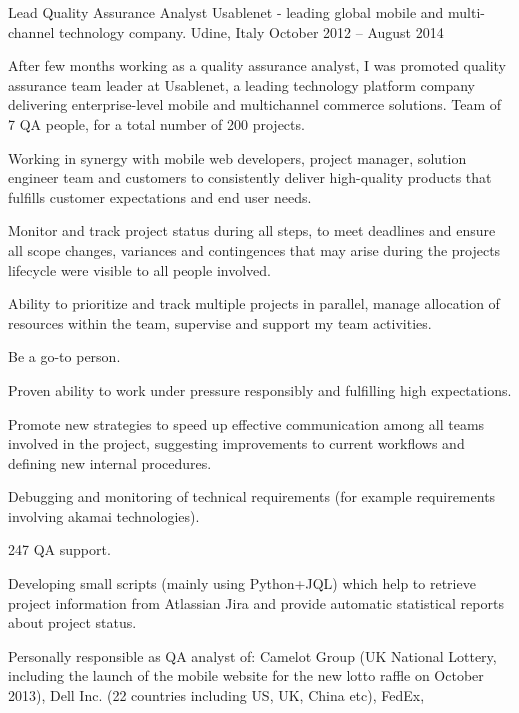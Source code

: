 \begin{cventries}
\cventry
{Lead Quality Assurance Analyst} 
{Usablenet - leading global mobile and multi-channel technology company.}
   {Udine, Italy}
{October 2012 -- August 2014}
   {
	\begin{cvitems}
	\item After few months working as a quality assurance analyst, I was
      promoted 
   quality assurance team leader at Usablenet, a leading 
  technology platform  company delivering enterprise-level mobile and
  multichannel commerce solutions. Team of 7 QA people, for a total number of 200 projects. 
\item 
  Working in synergy with mobile web
   developers, project manager, solution engineer team and customers to
   consistently deliver high-quality
   products that fulfills customer expectations and end user needs. 
\item Monitor and track project status during all steps, to meet deadlines
   and ensure all scope changes,
 variances and contingences that may arise during the 
 projects lifecycle were visible to all people involved.
 \item 
   Ability to prioritize and track multiple projects in parallel,
    manage  allocation of resources within the team, supervise and support my team
    activities.
 \item  Be a go-to person.
 \item 
   Proven ability to work under pressure responsibly and fulfilling high
   expectations.
\item Promote new strategies to speed up effective communication among all
   teams involved in the project, suggesting 
   improvements to current workflows and defining new internal procedures.
\item Debugging and monitoring of %
technical requirements (for example requirements involving
   akamai technologies).
\item 247 QA support.
   \item Developing small scripts (mainly using Python+JQL) which help to retrieve project
 information from Atlassian Jira and provide automatic statistical reports about
 project status.
   \item Personally responsible as QA analyst of:
   Camelot Group (UK National Lottery, including the
   launch of the mobile website for the new lotto raffle on October 2013), Dell Inc. (22 countries
   including US, UK, China etc), FedEx,

\end{cvitems}}
\end{cventries}
